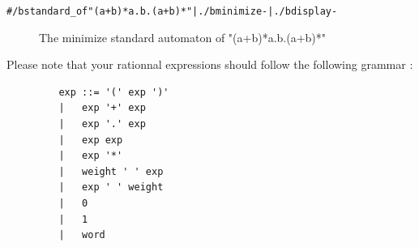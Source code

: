 \begin{alltt}
# /b standard_of "(a+b)*a.b.(a+b)*" | ./b minimize - | ./b display -
\end{alltt}
\begin{figure}[ht]
  \centering
  \caption{The minimize standard automaton of "(a+b)*a.b.(a+b)*"}
\end{figure}
Please note that your rationnal expressions should follow the
following grammar :
\begin{verbatim}
         exp ::= '(' exp ')'
         |   exp '+' exp
         |   exp '.' exp
         |   exp exp
         |   exp '*'
         |   weight ' ' exp
         |   exp ' ' weight
         |   0
         |   1
         |   word
\end{verbatim}

